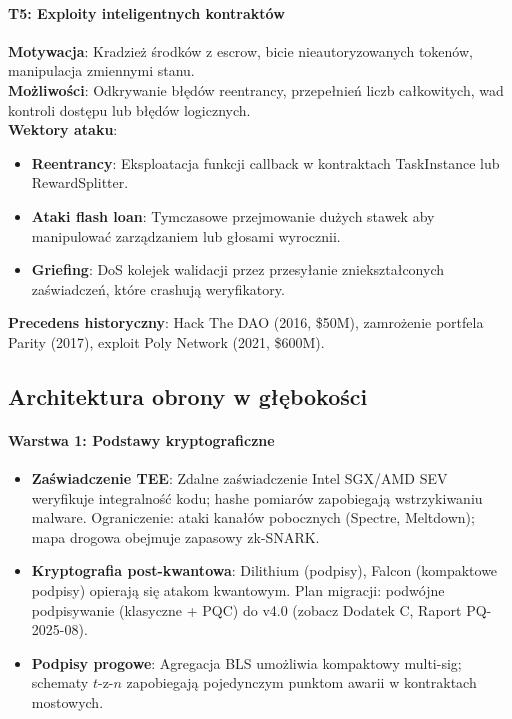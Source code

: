 \documentclass[11pt]{article}
\begin{document}
\paragraph{T5: Exploity inteligentnych kontraktów}
\textbf{Motywacja}: Kradzież środków z escrow, bicie nieautoryzowanych tokenów, manipulacja zmiennymi stanu.\\
\textbf{Możliwości}: Odkrywanie błędów reentrancy, przepełnień liczb całkowitych, wad kontroli dostępu lub błędów logicznych.\\
\textbf{Wektory ataku}:
\begin{itemize}[noitemsep]
  \item \textbf{Reentrancy}: Eksploatacja funkcji callback w kontraktach TaskInstance lub RewardSplitter.
  \item \textbf{Ataki flash loan}: Tymczasowe przejmowanie dużych stawek aby manipulować zarządzaniem lub głosami wyrocznii.
  \item \textbf{Griefing}: DoS kolejek walidacji przez przesyłanie zniekształconych zaświadczeń, które crashują weryfikatory.
\end{itemize}
\textbf{Precedens historyczny}: Hack The DAO (2016, \$50M), zamrożenie portfela Parity (2017), exploit Poly Network (2021, \$600M).

\subsection{Architektura obrony w głębokości}

\paragraph{Warstwa 1: Podstawy kryptograficzne}
\begin{itemize}[noitemsep]
  \item \textbf{Zaświadczenie TEE}: Zdalne zaświadczenie Intel SGX/AMD SEV weryfikuje integralność kodu; hashe pomiarów zapobiegają wstrzykiwaniu malware. Ograniczenie: ataki kanałów pobocznych (Spectre, Meltdown); mapa drogowa obejmuje zapasowy zk-SNARK.
  \item \textbf{Kryptografia post-kwantowa}: Dilithium (podpisy), Falcon (kompaktowe podpisy) opierają się atakom kwantowym. Plan migracji: podwójne podpisywanie (klasyczne + PQC) do v4.0 (zobacz Dodatek C, Raport PQ-2025-08).
  \item \textbf{Podpisy progowe}: Agregacja BLS umożliwia kompaktowy multi-sig; schematy $t$-z-$n$ zapobiegają pojedynczym punktom awarii w kontraktach mostowych.
\end{itemize}
\end{document}
